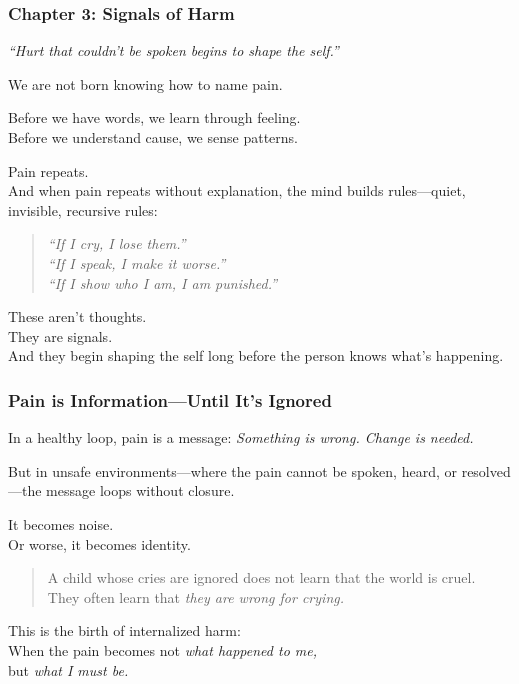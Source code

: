 \subsubsection{\texorpdfstring{\textbf{Chapter 3: Signals of
Harm}}{Chapter 3: Signals of Harm}}\label{chapter-3-signals-of-harm}

\emph{``Hurt that couldn't be spoken begins to shape the self.''}

We are not born knowing how to name pain.

Before we have words, we learn through feeling.\\
Before we understand cause, we sense patterns.

Pain repeats.\\
And when pain repeats without explanation, the mind builds
rules---quiet, invisible, recursive rules:

\begin{quote}
\emph{``If I cry, I lose them.''\\
} \emph{``If I speak, I make it worse.''\\
} \emph{``If I show who I am, I am punished.''}
\end{quote}

These aren't thoughts.\\
They are signals.\\
And they begin shaping the self long before the person knows what's
happening.

\subsubsection{\texorpdfstring{\textbf{Pain is Information---Until It's
Ignored}}{Pain is Information---Until It's Ignored}}\label{pain-is-informationuntil-its-ignored}

In a healthy loop, pain is a message: \emph{Something is wrong. Change
is needed.}

But in unsafe environments---where the pain cannot be spoken, heard, or
resolved---the message loops without closure.

It becomes noise.\\
Or worse, it becomes identity.

\begin{quote}
A child whose cries are ignored does not learn that the world is
cruel.\\
They often learn that \emph{they are wrong for crying.}
\end{quote}

This is the birth of internalized harm:\\
When the pain becomes not \emph{what happened to me,\\
} but \emph{what I must be.}

